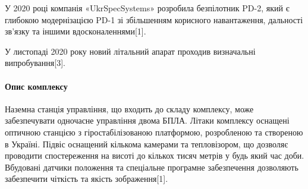 У 2020 році компанія «UkrSpecSystems» розробила безпілотник PD-2, який є
глибокою модернізацією PD-1 зі збільшенням корисного навантаження, дальності
зв'язку та іншими вдосконаленнями[1].

У листопаді 2020 року новий літальний апарат проходив визначальні
випробування[3]. 

\paragraph{Опис комплексу}

Наземна станція управління, що входить до складу комплексу, може забезпечувати
одночасне управління двома БПЛА. Літаки комплексу оснащені оптичною станцією з
гіростабілізованою платформою, розробленою та створеною в Україні. Підвіс
оснащений кількома камерами та тепловізором, що дозволяє проводити
спостереження на висоті до кількох тисяч метрів у будь який час доби. Вбудовані
датчики положення та спеціальне програмне забезпечення дозволяють забезпечити
чіткість та якість зображення[1]. 

